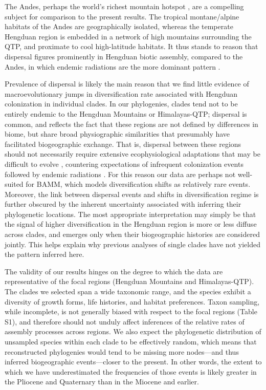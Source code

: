 \documentclass[9pt,twocolumn,twoside,lineno]{pnas-new}
\begin{document}
The Andes, perhaps the world's richest mountain hotspot
\citep{hughes2016}, are a compelling subject for comparison to the
present results. The tropical montane/alpine habitats of the Andes are
geographically isolated, whereas the temperate Hengduan region is
embedded in a network of high mountains surrounding the QTP, and
proximate to cool high-latitude habitats. It thus stands to reason
that dispersal figures prominently in Hengduan biotic assembly,
compared to the Andes, in which endemic radiations are the more
dominant pattern
\citep[e.g.,][]{pennington2010,Lagomarsino2016,Hughes2015,Luebert2014,Hughes2006}.

Prevalence of dispersal is likely the main reason that we find little
evidence of macroevolutionary jumps in diversification rate associated
with Hengduan colonization in individual clades. In our phylogenies,
clades tend not to be entirely endemic to the Hengduan Mountains or
Himalayas-QTP; dispersal is common, and reflects the fact that these
regions are not defined by differences in biome, but share broad
physiographic similarities that presumably have facilitated
biogeographic exchange. That is, dispersal between these regions
should not necessarily require extensive ecophysiological adaptations
that may be difficult to evolve \citep{Donoghue2014}, countering
expectations of infrequent colonization events followed by endemic
radiations \citep[cf.][]{Hughes2006}. For this reason our data are
perhaps not well-suited for BAMM, which models diversification shifts
as relatively rare events. Moreover, the link between dispersal events
and shifts in diversification regime is further obscured by the
inherent uncertainty associated with inferring their phylogenetic
locations. The most appropriate interpretation may simply be that the
signal of higher diversification in the Hengduan region is more or
less diffuse across clades, and emerges only when their biogeographic
histories are considered jointly. This helps explain why previous
analyses of single clades have not yielded the pattern inferred here.

The validity of our results hinges on the degree to which the data are
representative of the focal regions (Hengduan Mountains and
Himalayas-QTP). The clades we selected span a wide taxonomic range,
and the species exhibit a diversity of growth forms, life histories,
and habitat preferences. Taxon sampling, while incomplete, is not
generally biased with respect to the focal regions (Table S1), and
therefore should not unduly affect inferences of the relative rates of
assembly processes across regions. We also expect the phylogenetic
distribution of unsampled species within each clade to be effectively
random, which means that reconstructed phylogenies would tend to be
missing more nodes---and thus inferred biogeographic events---closer
to the present. In other words, the extent to which we have
underestimated the frequencies of those events is likely greater in
the Pliocene and Quaternary than in the Miocene and earlier.
\end{document}
